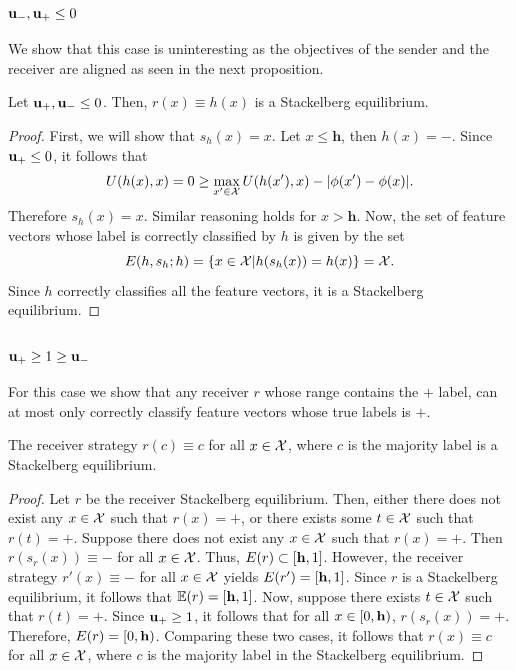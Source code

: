 \subsubsection{$\mathbf{u_-}, \mathbf{u_+} \leq 0$}
We show that this case is uninteresting as the objectives of the sender and the receiver are aligned as seen in the next proposition.


\begin{thm} Let $\mathbf{u_+},\mathbf{u_-} \leq 0$. Then,
$r(x) \equiv h(x)$ is a Stackelberg equilibrium.
	
\end{thm}
\begin{proof}
	First, we will show that $s_h(x) = x$. Let $x \leq \mathbf{h}$, then $h(x) = \minus$.
    Since $\mathbf{u_+} \leq 0$, it follows that
\[U(h(x),x) = 0 \geq \max_{x' \in \mathcal{X}}U(h(x'),x) - |\phi(x')-\phi(x)|.\]
Therefore $s_h(x) = x$. Similar reasoning holds for $x > \mathbf{h}$.
	Now, the set of feature vectors whose label is correctly classified by $h$ is given by the set
	$$E(h,s_h;h) = \{x \in \mathcal{X}| h(s_h(x)) = h(x)\} = \mathcal{X}.$$
	Since $h$ correctly classifies all the feature vectors, it is a Stackelberg equilibrium.
\end{proof}


\subsubsection{$\mathbf{u_+} \geq 1 \geq \mathbf{u_-}$}

For this case we show that any receiver $r$ whose range contains the $\plus$ label, can at most only correctly classify  feature vectors whose true labels is $\plus$.



\begin{thm}\label{prop:constant is equib}
The receiver strategy $r(c) \equiv c$ for all $x \in \mathcal{X}$, where $c$ is the majority label is a Stackelberg equilibrium.
\end{thm}

\begin{proof}
Let $r$ be the receiver Stackelberg equilibrium.
Then, either there does not exist any $x \in \mathcal{X}$ such that $r(x) = \plus$, or there exists some $t \in \mathcal{X}$ such that $r(t) = \plus$.
Suppose there does not exist any $x \in \mathcal{X}$ such that $r(x) = \plus$. Then $r(s_r(x)) \equiv \minus$ for all $x \in \mathcal{X}$. Thus, $E(r) \subset [\mathbf{h},1]$. However, the receiver strategy $r'(x) \equiv \minus$ for all $x \in \mathcal{X}$ yields $E(r') = [\mathbf{h},1]$. Since $r$ is a Stackelberg equilibrium, it follows that $\mathbb{E}(r) = [\mathbf{h},1]$.
Now, suppose there exists $t \in \mathcal{X}$ such that $r(t) = \plus$. Since $\mathbf{u_+} \geq 1$, it follows that for all $x \in [0,\mathbf{h})$, $r(s_r(x)) = \plus$. Therefore, $E(r) = [0,\mathbf{h})$.
Comparing these two cases, it follows that $r(x) \equiv c$ for all $x \in \mathcal{X}$, where $c$ is the majority label in the Stackelberg equilibrium.
\end{proof}


